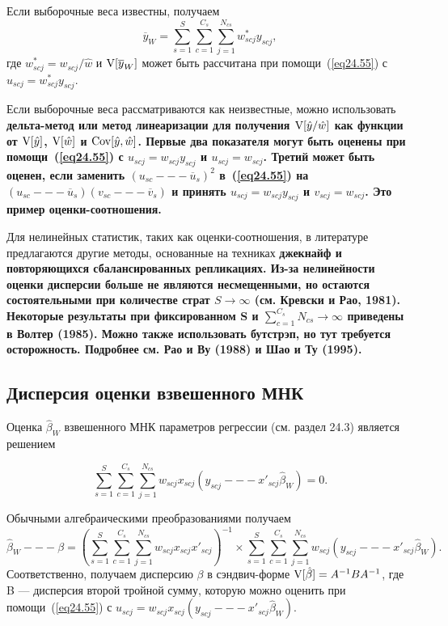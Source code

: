 Если выборочные веса известны, получаем
$$
\overline{y}_W = \sum_{s=1}^S \sum_{c=1}^{C_s} \sum_{j=1}^{N_{cs}} w^*_{scj} y_{scj},
$$
где $w^*_{scj} =w_{scj} / \hat w$ и $\mathrm{V}[\overline{y}_W]$ может быть рассчитана при помощи~(\ref{eq24.55}) с $u_{scj} = w^*_{scj} y_{scj}$. 

Если выборочные веса рассматриваются как неизвестные, можно использовать \bfseries дельта-метод \mdseries или \bfseries  метод линеаризации \mdseries для получения $\mathrm{V}[\hat y / \hat w]$ как функции от $\mathrm{V}[\hat y]$, $\mathrm{V}[\hat w]$ и $\mathrm{Cov}[\hat y, \hat w]$. Первые два показателя могут быть оценены при помощи~(\ref{eq24.55}) с $u_{scj} = w_{scj} y_{scj}$ и $u_{scj} = w_{scj}$. Третий может быть оценен, если заменить $(u_{sc} --- \overline{u}_s)^2$ в~(\ref{eq24.55}) на $(u_{sc} --- \overline{u}_s) (v_{sc} --- \overline{v}_s)$ и принять $u_{scj} = w_{scj} y_{scj}$ и $v_{scj} = w_{scj}$. Это пример оценки-соотношения. 

Для нелинейных статистик, таких как оценки-соотношения, в литературе предлагаются другие методы, основанные на техниках \bfseries джекнайф \mdseries и \bfseries повторяющихся сбалансированных репликациях. \mdseries Из-за нелинейности оценки дисперсии больше не являются несмещенными, но остаются состоятельными при количестве страт $S \to \infty$ (см. Кревски и Рао, 1981). Некоторые результаты при фиксированном S и $\sum_{c=1}^{C_s} N_{cs} \to \infty$ приведены в Волтер (1985). Можно также использовать \bfseries бутстрэп\mdseries, но тут требуется осторожность. Подробнее см. Рао и Ву (1988) и Шао и Ту (1995). 


\subsection*{Дисперсия оценки взвешенного МНК}

Оценка $\hat \beta_W$ взвешенного МНК параметров регрессии (см. раздел 24.3) является решением

$$
\sum_{s=1}^S \sum_{c=1}^{C_s} \sum_{j=1}^{N_{cs}} w_{scj} x_{scj} (y_{scj} --- x'_{scj} \hat \beta_W) = 0.
$$

Обычными алгебраическими преобразованиями получаем
$$
\hat \beta_W --- \beta = \left( \sum_{s=1}^S \sum_{c=1}^{C_s} \sum_{j=1}^{N_{cs}} w_{scj} x_{scj} x'_{scj} \right)^{-1} \times \sum_{s=1}^S \sum_{c=1}^{C_s} \sum_{j=1}^{N_{cs}} w_{scj} (y_{scj} --- x'_{scj} \hat \beta_W).
$$
Соответственно, получаем дисперсию $\beta$ в сэндвич-форме $\mathrm{V}[\hat \beta] = A^{-1} B A^{-1}$, где B --- дисперсия второй тройной сумму, которую можно оценить при помощи~(\ref{eq24.55}) с $u_{scj} = w_{scj} x_{scj} (y_{scj} --- x'_{scj} \hat \beta_W)$. 

